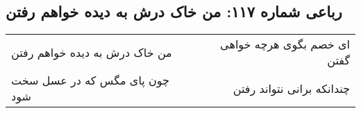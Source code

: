\begin{center}
\section*{رباعی شماره ۱۱۷: من خاک درش به دیده خواهم رفتن}
\label{sec:117}
\begin{longtable}{l p{0.5cm} r}
من خاک درش به دیده خواهم رفتن
&&
ای خصم بگوی هرچه خواهی گفتن
\\
چون پای مگس که در عسل سخت شود
&&
چندانکه برانی نتواند رفتن
\\
\end{longtable}
\end{center}
